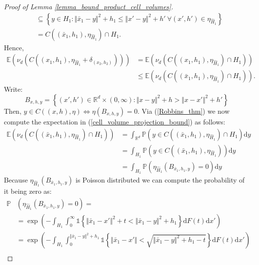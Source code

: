 \documentclass[10pt,a4paper]{amsart}
\newcommand{\EE}{\mathbb{E}}
\newcommand{\PP}{\mathbb{P}}
\newcommand{\RR}{\mathbb{R}}
\begin{document}
\begin{proof}[Proof of Lemma \ref{lemma_bound_product_cell_volumes}]
\begin{align}
        &\subseteq \left\{y \in H_1: \Vert \bar{x}_1 - y\Vert^2 + h_1 \leq  \Vert x' - y\Vert^2 + h' \ \forall (x',h') \in \eta_{\hat{H}_1} \right\}\nonumber \\
        &= C\left((\bar{x}_1,h_1),\eta_{\hat{H}_1}\right) \cap H_1. \nonumber
    \end{align}
    Hence,
    \begin{align}
        \EE\left(\nu_d\left(C\left((x_1,h_1),\eta_{\hat{H}_1}+\delta_{(x_2,h_2)}\right)\right)\right) &=  \EE\left(\nu_d\left(C\left((x_1,h_1),\eta_{\hat{H}_1}\right)\cap H_1\right)\right)\nonumber \\
        &\leq  \EE\left(\nu_d\left(C\left((\bar{x}_1,h_1),\eta_{\hat{H}_1}\right)\cap H_1\right)\right) \label{cell_volume_projection_bound}.
    \end{align}
    Write:
    \[B_{x,h,y} = \left\{(x',h')\in \RR^d \times (0,\infty): \Vert x - y \Vert^2 +h > \Vert x- x'\Vert^2 + h' \right\}\]
    Then, $y \in C((x,h),\eta) \iff \eta(B_{x,h,y}) = 0$. Via (\ref{Robbins_thm}) we now compute the expectation in (\ref{cell_volume_projection_bound}) as follows:
    \begin{align}
        \EE\left(\nu_d\left(C\left((\bar{x}_1,h_1),\eta_{\hat{H}_1}\right)\cap H_1\right)\right) &= \int_{\RR^d} \PP\left(y \in C\left((\bar{x}_1,h_1),\eta_{\hat{H}_1}\right)\cap H_1\right)\mathrm{d}y \nonumber \\
        &= \int_{H_1} \PP\left(y \in C\left((\bar{x}_1,h_1),\eta_{\hat{H}_1}\right)\right)\mathrm{d}y \nonumber \\
        &=\int_{H_1} \PP\left(\eta_{\hat{H}_1}\left(B_{\bar{x}_1,h_1,y} \right) = 0 \right)\mathrm{d}y \label{capped_cell_expected_volume}
    \end{align}
    Because $\eta_{\hat{H}_1}\left(B_{\bar{x}_1,h_1,y} \right)$ is Poisson distributed we can compute the probability of it being zero as:
    {\allowdisplaybreaks
    \begin{align}
        \PP&\left(\eta_{\hat{H}_1}\left(B_{\bar{x}_1,h_1,y} \right) = 0 \right) = \nonumber\\
        &=\exp\left(-\int_{H_1}\int_0^\infty \mathds{1}\left\{\Vert \bar{x}_1 - x'\Vert^2 + t < \Vert\bar{x}_1 - y \Vert^2 + h_1\right\}\mathrm{d}F(t)\mathrm{d}x'\right) \nonumber \\
        &= \exp\left(-\int_{H_1}\int_0^{\Vert\bar{x}_1 - y \Vert^2 + h_1} \mathds{1}\left\{\Vert \bar{x}_1 - x'\Vert < \sqrt{\Vert\bar{x}_1 - y \Vert^2 + h_1 - t}\right\}\mathrm{d}F(t)\mathrm{d}x'\right) \nonumber\\

\end{align}}
\end{proof}
\end{document}
